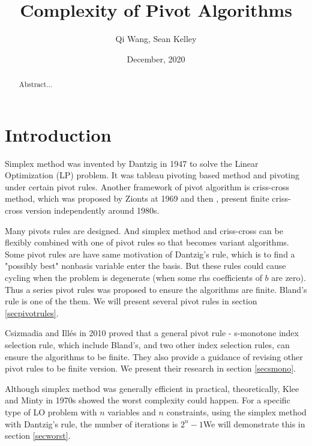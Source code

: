 \documentclass[11pt]{article}
\begin{document}
\newtheorem{theorem}{Theorem}
\newtheorem{corollary}{Corollary}
\newtheorem{lemma}{Lemma}
\newtheorem{definition}{Definition}
\DeclarePairedDelimiter{\norm}{\lVert}{\rVert} 

\title{Complexity of Pivot Algorithms}
\author{Qi Wang, Sean Kelley}
\date{December, 2020}
\maketitle


\begin{abstract}
Abstract...
\end{abstract}


\section{Introduction}
Simplex method was invented by Dantzig in 1947 \cite{dantzig1951maximization} to solve the Linear Optimization (LP) problem. It was tableau pivoting based method and pivoting under certain pivot rules. Another framework of pivot algorithm is criss-cross method, which was proposed by Zionts at 1969 \cite{fukuda1997criss} and then \cite{terlaky1987finite}, \cite{chang1979least} present finite criss-cross version independently around 1980s. 

 Many pivots rules are designed. And simplex method and criss-cross can be flexibly combined with one of pivot rules so that becomes variant algorithms. Some pivot rules are have same motivation of Dantzig's rule, which is to find a "possibly best" nonbasis variable enter the basis. But these rules could cause cycling when the problem is degenerate (when some rhs coefficients of $b$ are zero). Thus a series pivot rules was proposed to ensure the algorithms are finite. Bland's rule is one of the them. We will present several pivot rules in section \ref{secpivotrules}.

 Csizmadia and Illés in 2010 \cite{csizmadia2012s} proved that a general pivot rule - s-monotone index selection rule, which include Bland's, and two other index selection rules, can ensure the algorithms to be finite. They also provide a guidance of revising other pivot rules to be finite version. We present their research in section \ref{secsmono}. 

Although simplex method was generally efficient in practical, theoretically, Klee and Minty \cite{wikipediacontributors_2020_kleeminty} in 1970s showed the worst complexity could happen. For a specific type of LO problem with $n$ variables and $n$ constraints, using the simplex method with Dantzig's rule, the number of iterations is $2^n-1$We will demonstrate this in section \ref{secworst}.
\end{document}
